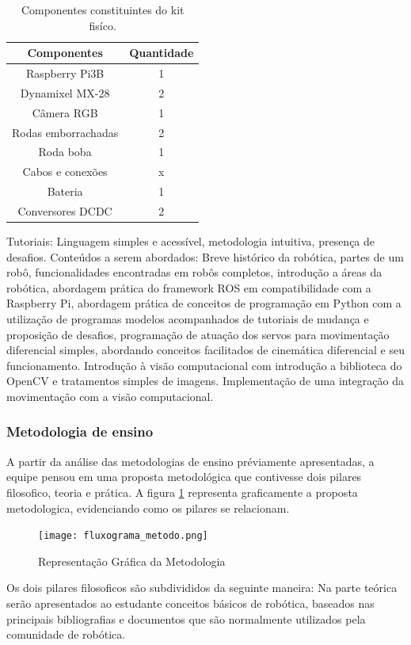\begin{table}
	\centering
	\begin{small}
		\caption{Componentes constituintes do kit fisíco.} \label{Tabela1}
		\begin{tabular}{cc}
			\hline
			Componentes              & Quantidade\\
			\hline
			Raspberry Pi3B              & 1 \\
			Dynamixel MX-28                & 2 \\
			Câmera RGB                    & 1 \\
			Rodas emborrachadas            & 2 \\
			Roda boba                    & 1 \\
			Cabos e conexões            & x \\
			Bateria                     & 1 \\
			Conversores DCDC            & 2 \\
			\hline
		\end{tabular}
	\end{small}
\end{table}

Tutoriais: Linguagem simples e acessível, metodologia intuitiva, presença de desafios.
Conteúdos a serem abordados: Breve histórico da robótica, partes de um robô, funcionalidades encontradas em robôs completos, introdução a áreas da robótica, abordagem prática do framework ROS em compatibilidade com a Raspberry Pi, abordagem prática de conceitos de programação em Python com a utilização de programas modelos acompanhados de tutoriais de mudança e proposição de desafios,
programação de atuação dos servos para movimentação diferencial simples, abordando conceitos facilitados de cinemática diferencial e seu funcionamento. Introdução à visão computacional com introdução a biblioteca do OpenCV e tratamentos simples de imagens.
Implementação de uma integração da movimentação com a visão computacional.

\subsubsection{Metodologia de ensino}
A partir da análise das metodologias de ensino préviamente apresentadas, a equipe pensou em uma proposta metodológica que contivesse dois pilares filosofico, teoria e prática. A figura \ref{img:rep_metod} representa graficamente a proposta metodologica, evidenciando como os pilares se relacionam.
\begin{figure}[h!]                                                
	\centering        
	\texttt{[image: fluxograma\_metodo.png]}            
	\caption{Representação Gráfica da Metodologia}        
	\label{img:rep_metod}    
\end{figure}
Os dois pilares filosoficos são subdivididos da seguinte maneira: Na parte teórica serão apresentados ao estudante conceitos básicos de robótica, baseados nas principais bibliografias e documentos que são normalmente utilizados pela comunidade de robótica.

